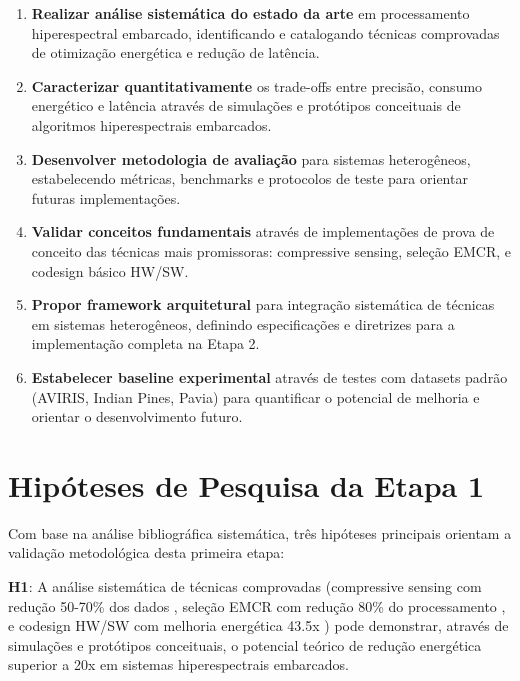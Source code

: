 \begin{enumerate}
\item \textbf{Realizar análise sistemática do estado da arte} em processamento hiperespectral embarcado, identificando e catalogando técnicas comprovadas de otimização energética e redução de latência.

\item \textbf{Caracterizar quantitativamente} os trade-offs entre precisão, consumo energético e latência através de simulações e protótipos conceituais de algoritmos hiperespectrais embarcados.

\item \textbf{Desenvolver metodologia de avaliação} para sistemas heterogêneos, estabelecendo métricas, benchmarks e protocolos de teste para orientar futuras implementações.

\item \textbf{Validar conceitos fundamentais} através de implementações de prova de conceito das técnicas mais promissoras: compressive sensing, seleção EMCR, e codesign básico HW/SW.

\item \textbf{Propor framework arquitetural} para integração sistemática de técnicas em sistemas heterogêneos, definindo especificações e diretrizes para a implementação completa na Etapa 2.

\item \textbf{Estabelecer baseline experimental} através de testes com datasets padrão (AVIRIS, Indian Pines, Pavia) para quantificar o potencial de melhoria e orientar o desenvolvimento futuro.
\end{enumerate}

\section{Hipóteses de Pesquisa da Etapa 1}

Com base na análise bibliográfica sistemática, três hipóteses principais orientam a validação metodológica desta primeira etapa:

\textbf{H1}: A análise sistemática de técnicas comprovadas (compressive sensing com redução 50-70\% dos dados \cite{lim2022}, seleção EMCR com redução 80\% do processamento \cite{martins2019}, e codesign HW/SW com melhoria energética 43.5x \cite{hwang2011}) pode demonstrar, através de simulações e protótipos conceituais, o potencial teórico de redução energética superior a 20x em sistemas hiperespectrais embarcados.

